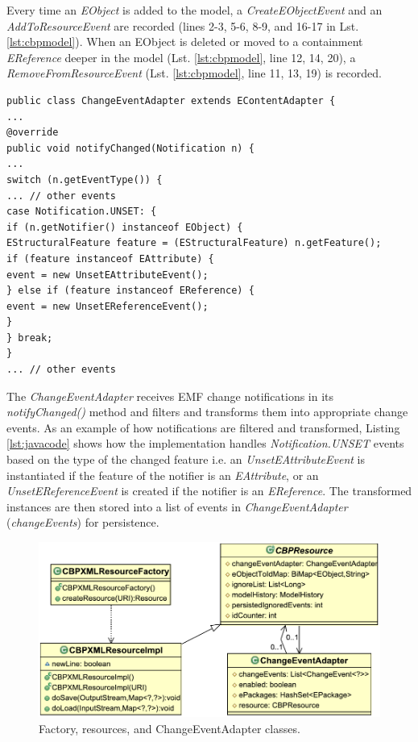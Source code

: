 \documentclass[12pt, a4paper]{report} \usepackage[titletoc]{appendix}
\begin{document}
Every time an \emph{EObject} is added to the model, a \emph{CreateEObjectEvent} and an \emph{AddToResourceEvent} are recorded (lines 2-3, 5-6, 8-9, and 16-17 in Lst. \ref{lst:cbpmodel}). When an EObject is deleted or moved to a containment \emph{EReference} deeper in the model (Lst. \ref{lst:cbpmodel}, line 12, 14, 20), a \emph{RemoveFromResourceEvent} (Lst. \ref{lst:cbpmodel}, line 11, 13, 19) is recorded.

\begin{lstlisting}[style=java,caption={Simplified Java code to handle notification events.},label=lst:javacode]
public class ChangeEventAdapter extends EContentAdapter {
...
@override
public void notifyChanged(Notification n) {
...
switch (n.getEventType()) {
... // other events
case Notification.UNSET: {
if (n.getNotifier() instanceof EObject) {
EStructuralFeature feature = (EStructuralFeature) n.getFeature();
if (feature instanceof EAttribute) {
event = new UnsetEAttributeEvent();
} else if (feature instanceof EReference) {
event = new UnsetEReferenceEvent();
}
} break;
} 
... // other events
\end{lstlisting}

The \emph{ChangeEventAdapter} receives EMF change notifications in its \emph{notifyChanged()} method and filters and transforms them into appropriate change events. As an example of how notifications are filtered and transformed, Listing \ref{lst:javacode} shows how the implementation handles \emph{Notification.UNSET} events based on the type of the changed feature i.e. an \emph{UnsetEAttributeEvent} is instantiated if the feature of the notifier is an \emph{EAttribute}, or an \emph{UnsetEReferenceEvent} is created if the notifier is an \emph{EReference}. The transformed instances are then stored into a list of events in \emph{ChangeEventAdapter} (\emph{changeEvents}) for persistence. 

\begin{figure}[th]
	\centering
	\includegraphics[width=0.6\linewidth]{resources}
	\caption{Factory, resources, and ChangeEventAdapter classes.}
	\label{fig:resources}
\end{figure}
\end{document}
